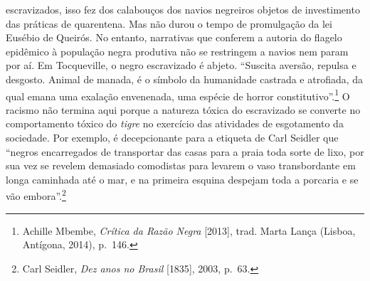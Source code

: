 escravizados, isso fez dos calabouços dos navios negreiros objetos de
investimento das práticas de quarentena. Mas não durou o tempo de
promulgação da lei Eusébio de Queirós. No entanto, narrativas que
conferem a autoria do flagelo epidêmico à população negra produtiva não
se restringem a navios nem param por aí. Em Tocqueville, o negro
escravizado é abjeto. ``Suscita aversão, repulsa e desgosto. Animal de
manada, é o símbolo da humanidade castrada e atrofiada, da qual emana
uma exalação envenenada, uma espécie de horror constitutivo''.\footnote{Achille
  Mbembe, \emph{Crítica da Razão Negra} {[}2013{]}, trad. Marta Lança
  (Lisboa, Antígona, 2014), p.~146.} O racismo não termina aqui porque a
natureza tóxica do escravizado se converte no comportamento tóxico do
\emph{tigre} no exercício das atividades de esgotamento da sociedade.
Por exemplo, é decepcionante para a etiqueta de Carl Seidler que
``negros encarregados de transportar das casas para a praia toda sorte
de lixo, por sua vez se revelem demasiado comodistas para levarem o vaso
transbordante em longa caminhada até o mar, e na primeira esquina
despejam toda a porcaria e se vão embora''.\footnote{Carl Seidler,
  \emph{Dez anos no Brasil} {[}1835{]}, 2003, p.~63.}

